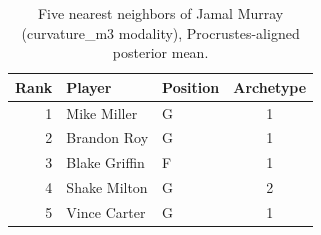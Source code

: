 \begin{table}[htbp]
  \centering\small
  \begin{tabular}{rllc}
    \toprule
    Rank & Player & Position & Archetype \\
    \midrule
    1 & Mike Miller & G & 1 \\
    2 & Brandon Roy & G & 1 \\
    3 & Blake Griffin & F & 1 \\
    4 & Shake Milton & G & 2 \\
    5 & Vince Carter & G & 1 \\
    \bottomrule
  \end{tabular}
  \caption{Five nearest neighbors of Jamal Murray (curvature_m3 modality), Procrustes-aligned posterior mean.}
  \label{tab:Jamal_Murray_neighbors_curvature_m3}
\end{table}

